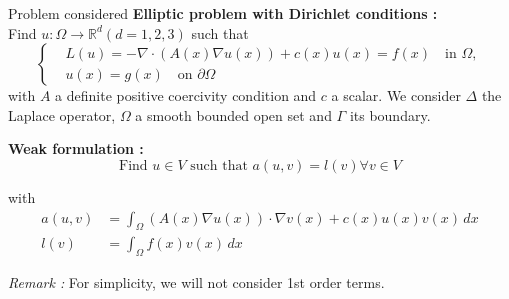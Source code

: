 \begin{frame}{Problem considered}
    \textbf{Elliptic problem with Dirichlet conditions :} \\
    Find $u : \Omega \rightarrow \mathbb{R}^d (d=1,2,3)$ such that
    \begin{equation}
    	\left\{\begin{aligned}
    		&L(u)=-\nabla \cdot (A(x) \nabla u(x)) + c(x)u(x) = f(x) \quad \text{in } \Omega, \\
    		&u(x) = g(x) \quad \text{on } \partial \Omega
    	\end{aligned}\right. \label{edp}
    \end{equation}
	with $A$ a definite positive coercivity condition and $c$ a scalar. We consider $\Delta$ the Laplace operator, $\Omega$ a smooth bounded open set and $\Gamma$ its boundary. 
    
    \textbf{Weak formulation :}
    \begin{equation*}
    	\text{Find } u\in V \text{ such that } a(u, v) = l (v) \forall v\in V
    \end{equation*}
    
    with
    \begin{align*}
    	a(u,v)&=\int_{\Omega} (A(x)\nabla u(x)) \cdot \nabla v(x) + c(x)u(x)v(x) \, dx \\
    	l(v)&=\int_{\Omega} f(x)v(x) \, dx
    \end{align*}
    
    \footnotesize
    \textit{Remark :} For simplicity, we will not consider 1st order terms. 

\end{frame}

